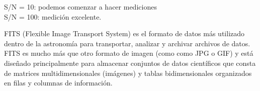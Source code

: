 \documentclass[9pt,twocolumn,a4paper]{opticajnl}
\begin{document}
\begin{description}[style=nextline]
  S/N = 10: podemos comenzar a hacer mediciones\\
  S/N = 100: medición excelente.\\
  \item[Archivos .fits] FITS (Flexible Image Transport System) es el formato de datos más utilizado dentro de la astronomía para transportar, analizar y archivar archivos de datos. FITS es mucho más que otro formato de imagen (como como JPG o GIF) y está diseñado principalmente para almacenar conjuntos de datos científicos que consta de matrices multidimensionales (imágenes) y tablas bidimensionales organizados en filas y columnas de información.
\end{description}

\printbibliography
\end{document}

